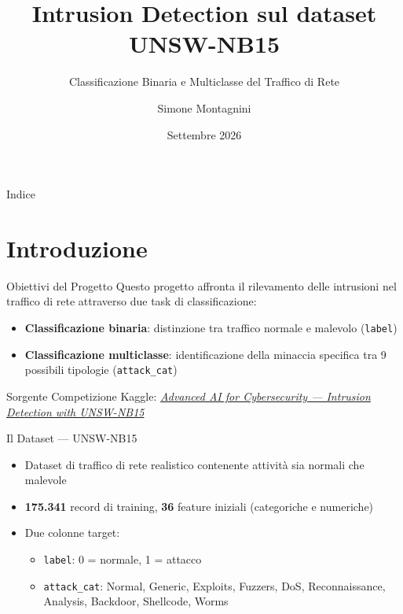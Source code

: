 \documentclass{beamer}
\title{Intrusion Detection sul dataset UNSW-NB15}
\subtitle{Classificazione Binaria e Multiclasse del Traffico di Rete}
\author{Simone Montagnini}
\institute{Università di Bologna}
\date{Settembre 2026}
\begin{document}
\frame{\titlepage}

\begin{frame}{Indice}
  \tableofcontents
\end{frame}

\section{Introduzione}

\begin{frame}{Obiettivi del Progetto}
  Questo progetto affronta il rilevamento delle intrusioni nel traffico di rete attraverso due task di classificazione:
  \begin{itemize}
    \item \textbf{Classificazione binaria}: distinzione tra traffico normale e malevolo
      (\texttt{label})
    \item \textbf{Classificazione multiclasse}: identificazione della minaccia specifica tra 9 possibili tipologie (\texttt{attack\_cat})
  \end{itemize}
  \vspace{0.5cm}
  \begin{block}{Sorgente}
  Competizione Kaggle: \href{https://www.kaggle.com/competitions/advanced-ai-for-cybersecurity-intrusion-detection-with-unsw-nb-15/overview}{\textit{Advanced AI for Cybersecurity — Intrusion Detection with UNSW-NB15}}
  \end{block}
\end{frame}

\begin{frame}{Il Dataset — UNSW-NB15}
  \begin{itemize}
    \item Dataset di traffico di rete realistico contenente attività sia normali che malevole
    \item \textbf{175.341} record di training, \textbf{36} feature iniziali
      (categoriche e numeriche)
    \item Due colonne target:
      \begin{itemize}
        \item \texttt{label}: 0 = normale, 1 = attacco
        \item \texttt{attack\_cat}: Normal, Generic, Exploits, Fuzzers, DoS,
          Reconnaissance, Analysis, Backdoor, Shellcode, Worms
      \end{itemize}
  \end{itemize}
\end{frame}
\end{document}
